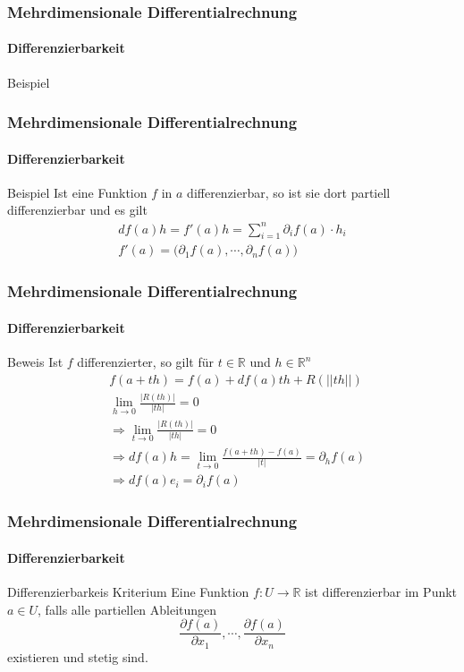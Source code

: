 \documentclass{beamer}
\begin{document}
\begin{frame}
    \frametitle{Mehrdimensionale Differentialrechnung}
\framesubtitle{Differenzierbarkeit}
    \begin{block}{Beispiel}

\end{block}
 \end{frame}

\begin{frame}
    \frametitle{Mehrdimensionale Differentialrechnung}
\framesubtitle{Differenzierbarkeit}
    \begin{block}{Beispiel}
Ist eine Funktion $f$ in $a$ differenzierbar, so ist sie dort partiell differenzierbar und es gilt
\begin{align*}
df(a)h = f'(a)h = \sum_{i=1}^{n} \partial_i f(a) \cdot h_i \\
f'(a) = \bigl( \partial_1f(a), \cdots , \partial_n f(a) \bigr)
\end{align*}

\end{block}
 \end{frame}

\begin{frame}
    \frametitle{Mehrdimensionale Differentialrechnung}
\framesubtitle{Differenzierbarkeit}
    \begin{block}{Beweis}
Ist $f$ differenzierter, so gilt für $t \in \mathbb{R}$ und $h \in \mathbb{R}^n$
\begin{align*}
& f(a + th)  =  f(a)  +  df(a) th + R(||th||) \\
& \lim_{h \to 0} \frac{|R(th)|}{|th|} = 0 \\
&\Rightarrow  \lim_{t \to 0} \frac{|R(th)|}{|th|} = 0 \\
&\Rightarrow  df(a)h = \lim_{t \to 0} \frac{f(a+th) - f(a)}{|t|} = \partial_h f(a)\\
&\Rightarrow df(a)e_i = \partial_if(a)
\end{align*}
\end{block}

 \end{frame}



\begin{frame}
    \frametitle{Mehrdimensionale Differentialrechnung}
\framesubtitle{Differenzierbarkeit}
    \begin{block}{Differenzierbarkeis Kriterium}
Eine Funktion $f: U \to \mathbb{R}$ ist  differenzierbar im Punkt $a \in U$, falls alle partiellen Ableitungen 
$$\frac{\partial f(a)}{\partial x_1}, \cdots, \frac{\partial f(a)}{\partial x_n}$$
 existieren und stetig sind.  
\end{block}
 \end{frame}
\end{document}
